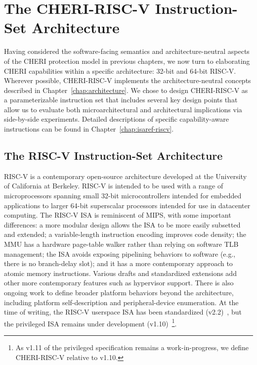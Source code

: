 \chapter{The CHERI-RISC-V Instruction-Set Architecture}
\label{chap:cheri-riscv}


\newcommand{\riscvloadcappagefault}{0x1A}
\newcommand{\riscvstorecappagefault}{0x1B}
\newcommand{\riscvcheriexception}{0x1C}

Having considered the software-facing semantics and architecture-neutral
aspects of the CHERI protection model in previous chapters, we now turn to
elaborating CHERI capabilities within a specific architecture: 32-bit
and 64-bit RISC-V.
Wherever possible, CHERI-RISC-V implements the architecture-neutral concepts
described in Chapter~\ref{chap:architecture}.
We chose to design CHERI-RISC-V as a parameterizable instruction set that
includes several key design points that allow us to evaluate both
microarchitectural and architectural implications via side-by-side
experiments.
Detailed descriptions of specific capability-aware instructions can be found
in Chapter~\ref{chap:isaref-riscv}.

\section{The RISC-V Instruction-Set Architecture}

RISC-V is a contemporary open-source architecture developed at the University
of California at Berkeley.
RISC-V is intended to be used with a range of microprocessors spanning small
32-bit microcontrollers intended for embedded applications to larger 64-bit
superscalar processors intended for use in datacenter computing.
The RISC-V ISA is reminiscent of MIPS, with some important differences: a more
modular design allows the ISA to be more easily subsetted and extended; a
variable-length instruction encoding improves code density; the MMU has a
hardware page-table walker rather than relying on software TLB management;
the ISA avoids exposing pipelining behaviors to software (e.g., there is no
branch-delay slot); and it has a more contemporary approach to atomic memory
instructions.
Various drafts and standardized extensions add other more contemporary
features such as hypervisor support.  There is also ongoing work to define
broader platform behaviors beyond the architecture, including platform
self-description and peripheral-device enumeration.
At the time of writing, the RISC-V userspace ISA has been standardized
(v2.2)~\cite{RISCV:User:2.2}, but the privileged ISA remains under
development (v1.10)~\cite{RISCV:Privileged:1.10}\footnote{As v1.11 of the
privileged specification remains a work-in-progress, we define CHERI-RISC-V
relative to v1.10.}. 

